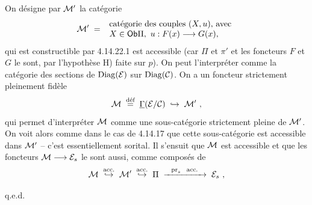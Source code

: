 
On désigne par $\mathcal{M}'$ la catégorie
\[
\mathcal{M}' \;=\;
\begin{array}{l}
\text{catégorie des couples } (X,u)\text{, avec}\\
X \in \mathsf{Ob}\Pi,\ u : F(x) \longrightarrow G(x),
\end{array}
\] %
qui est constructible par 4.14.22.1 est accessible (car $\Pi$ et $\pi'$ et les foncteurs $F$ et $G$ le sont, par l'hypothèse H) faite sur $p$). On peut l'interpréter comme la catégorie des sections %
de $\mathrm{Diag}(\mathcal{E})$ sur $\mathrm{Diag}(\mathcal{C})$. On a un foncteur strictement pleinement fidèle
\[
\cM \;\defeq\; \underline{\Gamma}(\cE/\cC) \;\hookrightarrow\; \cM'\ ,
\]
qui permet d'interpréter $\mathcal{M}$ comme une sous-catégorie strictement pleine de $\mathcal{M}'$. On voit alors comme dans le cas de 4.14.17 que cette sous-catégorie est accessible dans $\mathcal{M}'$ -- c'est essentiellement sorital. Il s'ensuit que $\mathcal{M}$ est accessible et que les foncteurs $\mathcal{M} \longrightarrow \mathcal{E}_s$ le sont aussi, comme composés de
\[
\mathcal{M} \;\overset{\text{\upshape acc.}}{\hookrightarrow}\; \mathcal{M}' \;\overset{\text{\upshape acc.}}{\hookrightarrow}\; \Pi \;\xrightarrow{\ \ \mathrm{pr}_s\ \ \text{\upshape acc.}\ \ }\; \mathcal{E}_s\ ,
\]

\hfill q.e.d.


